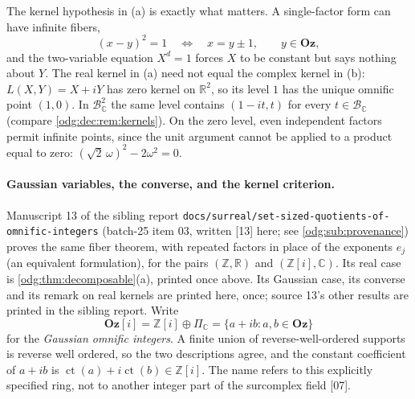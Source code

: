 \documentclass[11pt,oneside]{article}
\numberwithin{equation}{section}
\theoremstyle{definition}
\theoremstyle{remark}
\newcommand{\Oz}{\mathbf{Oz}}
\newcommand{\Z}{\mathbb Z}
\newcommand{\R}{\mathbb R}
\newcommand{\C}{\mathbb C}
\newcommand{\BC}{\mathcal B_{\C}}
\newcommand{\ct}{\operatorname{ct}}
\newcommand{\src}[1]{\textup{\textsf{\small[#1]}}}
\newcommand{\fn}[1]{\nolinkurl{#1}}
\newcommand{\Og}{\Oz[i]}
\begin{document}
The kernel hypothesis in (a) is exactly what matters. A single-factor form
can have infinite fibers,
\[
 (x-y)^2=1\quad\Longleftrightarrow\quad x=y\pm1,\qquad y\in\Oz,
\]
and the two-variable equation $X^d=1$ forces $X$ to be constant but says
nothing about $Y$. The real kernel in (a) need not equal the complex kernel
in (b): $L(X,Y)=X+iY$ has zero kernel on $\R^2$, so its level $1$ has the
unique omnific point $(1,0)$. In $\BC^2$ the same level contains
$(1-it,t)$ for every $t\in\BC$ (compare \cref{odg:dec:rem:kernels}). On the zero level, even independent factors
permit infinite points, since the unit argument cannot be applied to a product
equal to zero: $(\sqrt2\,\omega)^2-2\omega^2=0$.

\paragraph{Gaussian variables, the converse, and the kernel criterion.}
Manuscript 13 of the sibling report
\fn{docs/surreal/set-sized-quotients-of-omnific-integers} (batch-25 item 03,
written \src{13} here; see \cref{odg:sub:provenance}) proves the same fiber
theorem, with repeated factors in place of the exponents $e_j$ (an
equivalent formulation), for the pairs $(\Z,\R)$ and $(\Z[i],\C)$. Its real
case is \cref{odg:thm:decomposable}(a), printed once above. Its Gaussian
case, its converse and its remark on real kernels are printed here, once;
source 13's other results are printed in the sibling report. Write
\[
 \Og=\Z[i]\oplus\Pi_{\C}=\{a+ib:a,b\in\Oz\}
\]
for the \emph{Gaussian omnific integers}. A finite union of reverse-well-ordered
supports is reverse well ordered, so the two descriptions agree, and the
constant coefficient of $a+ib$ is $\ct(a)+i\ct(b)\in\Z[i]$. The name refers to
this explicitly specified ring, not to another integer part of the surcomplex
field \src{07}.
\end{document}
